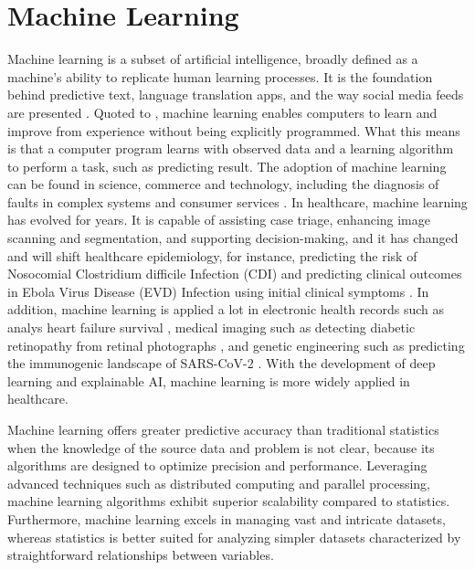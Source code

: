 \documentclass[12pt,a4paper,english
]{tunithesis}
\begin{document}
\section{Machine Learning}
Machine learning is a subset of artificial intelligence, broadly defined as a machine's ability to replicate human learning processes. It is the foundation behind predictive text, language translation apps, and the way social media feeds are presented \parencite{sara2021}. Quoted to \textcite{samuel1959}, machine learning enables computers to learn and improve from experience without being explicitly programmed. What this means is that a computer program learns with observed data and a learning algorithm to perform a task, such as predicting result. %
The adoption of machine learning can be found in science, commerce and technology, including the diagnosis of faults in complex systems and consumer services \parencite{jorden2015}. In healthcare, machine learning has evolved for years. It is capable of assisting case triage, enhancing image scanning and segmentation, and supporting decision-making, and it has changed and will shift healthcare epidemiology, for instance, predicting the risk of Nosocomial Clostridium difficile Infection (CDI) and predicting clinical outcomes in Ebola Virus Disease (EVD) Infection using initial clinical symptoms \parencite{Jenna2017, Habehh2021}. In addition, machine learning is applied a lot in electronic health records such as analys heart failure survival \parencite{Panahiazar2015}, medical imaging such as detecting diabetic retinopathy from retinal photographs \parencite{Gulshan2016}, and genetic engineering such as predicting the immunogenic landscape of SARS-CoV-2 \parencite{Malone2020} . With the development of deep learning and explainable AI, machine learning is more widely applied in healthcare.

Machine learning offers greater predictive accuracy than traditional statistics when the knowledge of the source data and problem is not clear, because its algorithms are designed to optimize precision and performance. Leveraging advanced techniques such as distributed computing and parallel processing, machine learning algorithms exhibit superior scalability compared to statistics. Furthermore, machine learning excels in managing vast and intricate datasets, whereas statistics is better suited for analyzing simpler datasets characterized by straightforward relationships between variables.  \parencite{Bzdok2018, Rajula2020}
\end{document}
